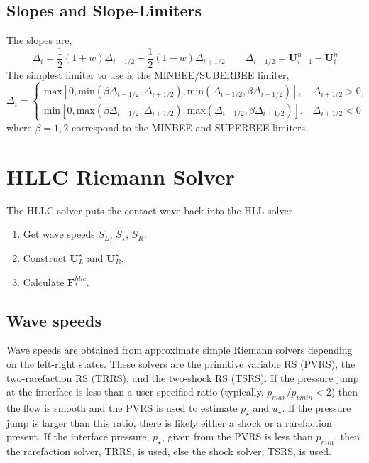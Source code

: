\documentclass{article}
\begin{document}
\subsection{Slopes and Slope-Limiters}
The slopes are,
\begin{equation}
    \Delta_i = \frac{1}{2} (1 + w) \Delta_{i-1/2} + \frac{1}{2} ( 1 - w) \Delta_{i+1/2} 
    \qquad
    \Delta_{i+1/2} = \mathbf{U}_{i+1}^n - \mathbf{U}_i^n
\end{equation}
The simplest limiter to use is the MINBEE/SUBERBEE limiter,
\begin{equation}
\Delta_i = 
\begin{cases}
 \text{max}\left[ 0 , \text{min}(\beta \Delta_{i-1/2}, \Delta_{i+1/2}), \text{min}(\Delta_{i-1/2}, \beta \Delta_{i+1/2}) \right],  & \Delta_{i+1/2} > 0 , \\
 \text{min}\left[ 0 , \text{max}(\beta \Delta_{i-1/2}, \Delta_{i+1/2}), \text{max}(\Delta_{i-1/2}, \beta \Delta_{i+1/2}) \right],  & \Delta_{i+1/2} < 0 
\end{cases}
\end{equation}
where $\beta=1,2$ correspond to the MINBEE and SUPERBEE limiters.


\section{HLLC Riemann Solver}

The HLLC solver puts the contact wave back into the HLL solver. 

\begin{enumerate}
\item Get wave speeds $S_L$, $S_\star$, $S_R$.
\item Construct $\mathbf{U}_L^\star$ and $\mathbf{U}_R^\star$.
\item Calculate $\mathbf{F}_*^{hllc}$.
\end{enumerate}



\subsection{Wave speeds}
Wave speeds are obtained from approximate simple Riemann solvers depending on the left-right states. These solvers are the primitive variable RS (PVRS), the two-rarefaction RS (TRRS), and the two-shock RS (TSRS). If the pressure jump at the interface is less than a user specified ratio (typically, $p_{max}/p_{pmin} < 2$) then the flow is smooth and the PVRS is used to estimate $p_\star$ and $u_\star$. If the pressure jump is larger than this ratio, there is likely either a shock or a rarefaction present. If the interface pressure, $p_\star$, given from the PVRS is less than $p_{min}$, then the rarefaction solver, TRRS, is used, else the shock solver, TSRS, is used. 
\end{document}
